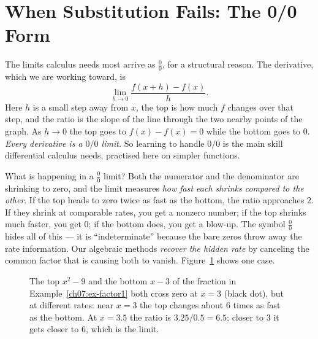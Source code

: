 \section{When Substitution Fails: The 0/0 Form}
\label{ch07:zerozero}

The limits calculus needs most
arrive as $\frac{0}{0}$, for a structural reason. The derivative,
which we are working toward, is
\[
  \lim_{h\to 0} \frac{f(x+h) - f(x)}{h}.
\]
Here $h$ is a small step away from $x$, the top is how much $f$ changes over
that step, and the ratio is the slope of the line through the two nearby points
of the graph. As $h\to 0$ the top goes to $f(x)-f(x)=0$ while the bottom goes to $0$.
\emph{Every derivative is a $0/0$ limit.} So learning to handle $0/0$ is
the main skill differential calculus needs, practised here
on simpler functions.

\begin{happeningbox}
What is happening in a $\frac{0}{0}$ limit? Both the numerator and the
denominator are shrinking to zero, and the limit measures \emph{how fast each
shrinks compared to the other}. If the top heads to zero twice as fast as the
bottom, the ratio approaches $2$. If they shrink at comparable
rates, you get a nonzero number; if the top shrinks much faster, you get $0$; if the bottom
does, you get a blow-up. The symbol $\frac{0}{0}$ hides all of this --- it is
``indeterminate'' because the bare zeros throw away the rate
information. Our algebraic methods \emph{recover the
hidden rate} by canceling the common factor that is causing both to vanish.
Figure~\ref{ch07:fig-rates} shows one case.
\end{happeningbox}

\begin{figure}[htbp]
\centering
{}
\caption{The top $x^{2}-9$ and the bottom $x-3$ of the fraction in
Example~\ref{ch07:ex-factor1} both cross zero at $x=3$ (black dot), but at
different rates: near $x=3$ the top changes about $6$ times as fast as the
bottom. At $x=3.5$ the ratio is $3.25/0.5=6.5$; closer to $3$ it gets closer to $6$,
which is the limit.}
\label{ch07:fig-rates}
\end{figure}

